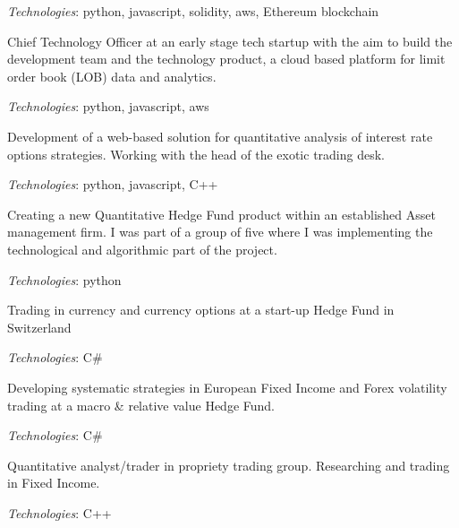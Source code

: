 {\it Technologies}: python, javascript, solidity, aws, Ethereum blockchain



Chief Technology Officer at an early stage tech startup with the aim to build the development team and the technology product,
a cloud based platform for limit order book (LOB) data and analytics.

{\it Technologies}: python, javascript, aws


Development of a web-based solution for quantitative analysis of interest rate options strategies.
Working with the head of the exotic trading desk.

{\it Technologies}: python, javascript, C++


Creating a new Quantitative Hedge Fund product within an established Asset management firm.
I was part of a group of five where I was implementing the technological and algorithmic part of the project.

{\it Technologies}: python


Trading in currency and currency options at a start-up Hedge Fund in Switzerland

{\it Technologies}: C\#


Developing systematic strategies in European Fixed Income and Forex volatility trading at a macro \& relative value Hedge Fund.

{\it Technologies}: C\#


Quantitative analyst/trader in propriety trading group. Researching and trading in Fixed Income.

{\it Technologies}: C++

